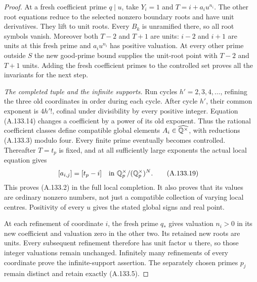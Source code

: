 \begin{proof}
At a fresh coefficient prime \(q\mid u\), take
\(Y_i=1\) and \(T=i+a_i u^{n_i}\).
The other root equations reduce to the selected
nonzero boundary roots and have unit derivatives.
They lift to unit roots.
Every \(B_k\) is unramified there, so all root
symbols vanish.
Moreover both \(T-2\) and \(T+1\) are units:
\(i-2\) and \(i+1\) are units at this fresh prime
and \(a_i u^{n_i}\) has positive valuation.
At every other prime outside \(S\) the new good-prime
bound supplies the unit-root point with \(T-2\)
and \(T+1\) units.
Adding the fresh coefficient primes to the controlled
set proves all the invariants for the next step.

\emph{The completed tuple and the infinite supports.}
Run cycles \(h'=2,3,4,\ldots\), refining the three
old coordinates in order during each cycle.
After cycle \(h'\), their common exponent is
\(4h'!\), cofinal under divisibility by every positive
integer.  Equation (A.133.14) changes a coefficient
by a power of its old exponent.
Thus the rational coefficient classes define
compatible global elements \(A_i\in\widehat{\mathbb Q^\times}\),
with reductions (A.133.3) modulo four.
Every finite prime eventually becomes controlled.
Thereafter \(T=t_p\) is fixed, and at all sufficiently
large exponents the actual local equation gives
\[
                [a_{i,j}]=[t_p-i]
                        \quad\text{in }\mathbb Q_p^\times/(\mathbb Q_p^\times)^N.
\tag{A.133.19}
\]
This proves (A.133.2) in the full local completion.
It also proves that its values are ordinary nonzero
numbers, not just a compatible collection of varying
local centres.  Positivity of every \(u\) gives the
stated global signs and real point.

At each refinement of coordinate \(i\), the fresh
prime \(q_*\) gives valuation \(n_i>0\) in its new
coefficient and valuation zero in the other two.
Its retained new roots are units.
Every subsequent refinement therefore has unit
factor \(u\) there, so those integer valuations
remain unchanged.
Infinitely many refinements of every coordinate
prove the infinite-support assertion.
The separately chosen primes \(p_j\) remain
distinct and retain exactly (A.133.5).


\end{proof}
